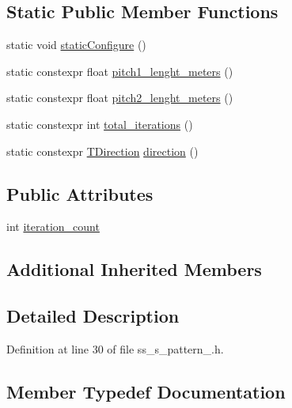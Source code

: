 \subsection*{Static Public Member Functions}
\begin{DoxyCompactItemize}
\item 
static void \hyperlink{structsm__dance__bot__3_1_1SS5_1_1SsSPattern1_a7e388010bca7db8e999d424f5b87d2c4}{static\+Configure} ()
\item 
static constexpr float \hyperlink{structsm__dance__bot__3_1_1SS5_1_1SsSPattern1_ae1ab8de1c53ef34e844e3b9812df69bb}{pitch1\+\_\+lenght\+\_\+meters} ()
\item 
static constexpr float \hyperlink{structsm__dance__bot__3_1_1SS5_1_1SsSPattern1_a1f789b55772fd7504d6a1eeeeb8d2633}{pitch2\+\_\+lenght\+\_\+meters} ()
\item 
static constexpr int \hyperlink{structsm__dance__bot__3_1_1SS5_1_1SsSPattern1_a8df8490a97d4c4704d1c583888d5be23}{total\+\_\+iterations} ()
\item 
static constexpr \hyperlink{namespacesm__dance__bot__3_1_1SS5_afb36760ee122ff90c189fc415cc8daa5}{T\+Direction} \hyperlink{structsm__dance__bot__3_1_1SS5_1_1SsSPattern1_adce5119ce940a1455ab8074e86c98c58}{direction} ()
\end{DoxyCompactItemize}
\subsection*{Public Attributes}
\begin{DoxyCompactItemize}
\item 
int \hyperlink{structsm__dance__bot__3_1_1SS5_1_1SsSPattern1_a4036a16738f35128aae6a1577496c0b5}{iteration\+\_\+count}
\end{DoxyCompactItemize}
\subsection*{Additional Inherited Members}


\subsection{Detailed Description}


Definition at line 30 of file ss\+\_\+s\+\_\+pattern\+\_.\+h.



\subsection{Member Typedef Documentation}
